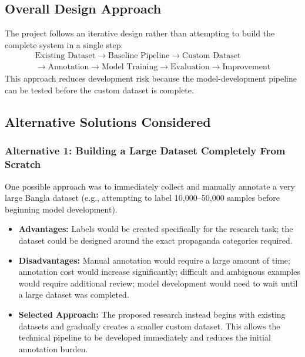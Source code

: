 \subsection{Overall Design Approach}
The project follows an iterative design rather than attempting to build the
complete system in a single step:
\[
\begin{gathered}
\text{Existing Dataset} \rightarrow \text{Baseline Pipeline} \rightarrow \text{Custom Dataset} \\
\rightarrow \text{Annotation} \rightarrow \text{Model Training} \rightarrow \text{Evaluation} \rightarrow \text{Improvement}
\end{gathered}
\]
This approach reduces development risk because the model-development pipeline can
be tested before the custom dataset is complete.

\subsection{Alternative Solutions Considered}

\subsubsection{Alternative 1: Building a Large Dataset Completely From Scratch}
One possible approach was to immediately collect and manually annotate a very large
Bangla dataset (e.g., attempting to label 10,000--50,000 samples before beginning
model development).
\begin{itemize}
  \item \textbf{Advantages:} Labels would be created specifically for the research
        task; the dataset could be designed around the exact propaganda categories
        required.
  \item \textbf{Disadvantages:} Manual annotation would require a large amount of
        time; annotation cost would increase significantly; difficult and
        ambiguous examples would require additional review; model development
        would need to wait until a large dataset was completed.
  \item \textbf{Selected Approach:} The proposed research instead begins with
        existing datasets and gradually creates a smaller custom dataset. This
        allows the technical pipeline to be developed immediately and reduces the
        initial annotation burden.
\end{itemize}

